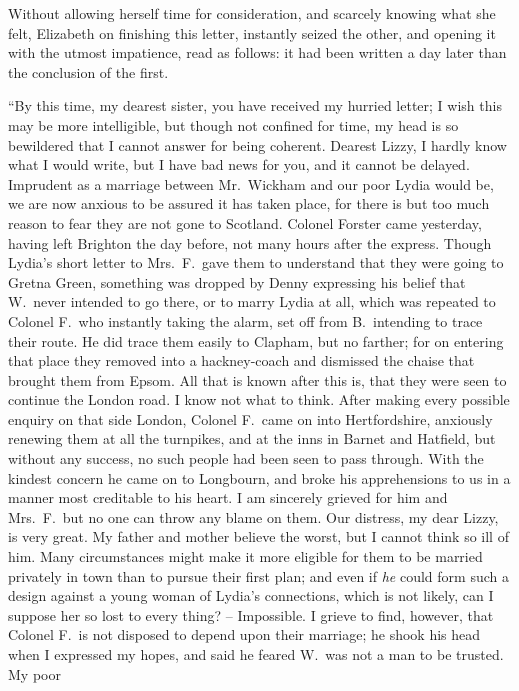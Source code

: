 Without allowing herself time for consideration, and
scar\-cely knowing what she felt, Elizabeth on finishing this
letter, instantly seized the other, and opening it with the
utmost impatience, read as follows: it had been written
a day later than the conclusion of the first.

“By this time, my dearest sister, you have received
my hurried letter; I wish this may be more intelligible,
but though not confined for time, my head is so bewildered
that I cannot answer for being coherent. Dearest Lizzy,
I hardly know what I would write, but I have bad news
for you, and it cannot be delayed. Imprudent as a marriage
between Mr.\ Wickham and our poor Lydia would be, we
are now anxious to be assured it has taken place, for
there is but too much reason to fear they are not gone to
Scotland. Colonel Forster came yesterday, having left
Brighton the day before, not many hours after the express.
Though Lydia’s short letter to Mrs.\ F.\ gave them to understand
that they were going to Gretna Green, something
was dropped by Denny expressing his belief that W.\ never
intended to go there, or to marry Lydia at all, which was
repeated to Colonel F.\ who instantly taking the alarm,
set off from B.\ intending to trace their route. He did
trace them easily to Clapham, but no farther; for on
entering that place they removed into a hackney-coach
and dismissed the chaise that brought them from Epsom.
All that is known after this is, that they were seen to
continue the London road. I know not what to think.
After making every possible enquiry on that side London,
Colonel F.\ came on into Hertfordshire, anxiously renewing
them at all the turnpikes, and at the inns in Barnet and
Hatfield, but without any success, no such people had
been seen to pass through. With the kindest concern he
came on to Longbourn, and broke his apprehensions to us
in a manner most creditable to his heart. I am sincerely
grieved for him and Mrs.\ F.\ but no one can throw any
blame on them. Our distress, my dear Lizzy, is very great.
My father and mother believe the worst, but I cannot
think so ill of him. Many circumstances might make it
more eligible for them to be married privately in town than
to pursue their first plan; and even if \textit{he} could form such
a design against a young woman of Lydia’s connections,
which is not likely, can I suppose her so lost to every
thing? -- Impossible. I grieve to find, however, that
Colonel F.\ is not disposed to depend upon their marriage;
he shook his head when I expressed my hopes, and said
he feared W.\ was not a man to be trusted. My poor
